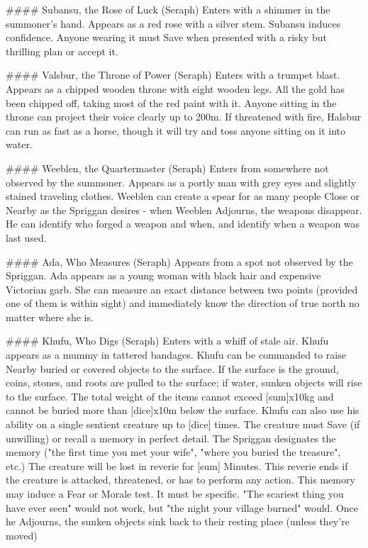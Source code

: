 ####  Subansu, the Rose of Luck (Seraph)
Enters with a shimmer in the summoner's hand. Appears as a red rose with a silver stem. Subansu induces confidence. Anyone wearing it must Save when presented with a risky but thrilling plan or accept it. 


####  Valsbur, the Throne of Power (Seraph)
Enters with a trumpet blast. Appears as a chipped wooden throne with eight wooden legs. All the gold has been chipped off, taking most of the red paint with it. Anyone sitting in the throne can project their voice clearly up to 200m.  If threatened with fire, Halsbur can run as fast as a horse, though it will try and toss anyone sitting on it into water.


####  Weeblen, the Quartermaster (Seraph)
Enters from somewhere not observed by the summoner. Appears as a portly man with grey eyes and slightly stained traveling clothes. Weeblen can create a spear for as many people Close or Nearby as the Spriggan desires - when Weeblen Adjourns, the weapons disappear.   He can identify who forged a weapon and when, and identify when a weapon was last used. 


#### Ada, Who Measures (Seraph)
Appears from a spot not observed by the Spriggan.  Ada appears as a young woman with black hair and expensive Victorian garb.  She can measure an exact distance between two points (provided one of them is within sight) and immediately know the direction of true north no matter where she is. 



#### Khufu, Who Digs (Seraph)
Enters with a whiff of stale air.  Khufu appears as a mummy in tattered bandages.  Khufu can be commanded to raise Nearby buried or covered objects to the surface.  If the surface is the ground, coins, stones, and roots are pulled to the surface; if water, sunken objects will rise to the surface.  The total weight of the items cannot exceed [sum]x10kg and cannot be buried more than [dice]x10m below the surface.  Khufu can also use his ability on a single sentient creature up to [dice] times.  The creature must Save (if unwilling) or recall a memory in perfect detail.  The Spriggan designates the memory ("the first time you met your wife", "where you buried the treasure", etc.)  The creature will be lost in reverie for [sum] Minutes.  This reverie ends if the creature is attacked, threatened, or has to perform any action. This memory may induce a Fear or Morale test. It must be specific. "The scariest thing you have ever seen" would not work, but "the night your village burned" would.  Once he Adjourns, the sunken objects sink back to their resting place (unless they're moved)


